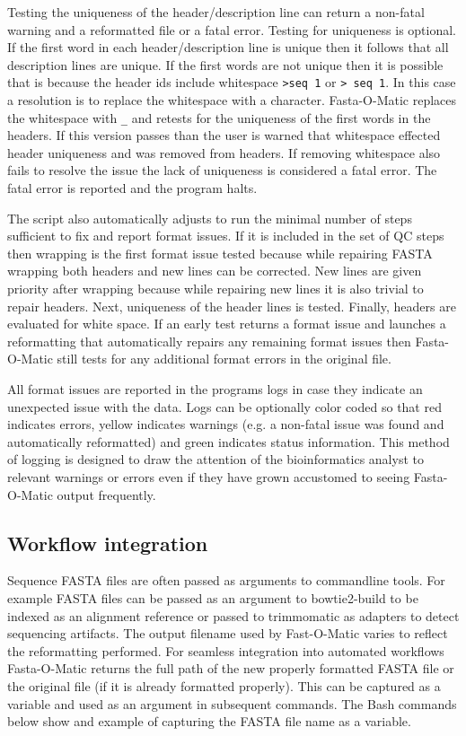 Testing the uniqueness of the header/description line can return a non-fatal warning and a reformatted file or a fatal error. Testing for uniqueness is optional. If the first word in each header/description line is unique then it follows that all description lines are unique. If the first words are not unique then it is possible that is because the header ids include whitespace \verb|>seq 1| or \verb|> seq 1|. In this case a resolution is to replace the whitespace with a character. Fasta-O-Matic replaces the whitespace with \verb|_| and retests for the uniqueness of the first words in the headers. If this version passes than the user is warned that whitespace effected header uniqueness and was removed from headers. If removing whitespace also fails to resolve the issue the lack of uniqueness is considered a fatal error. The fatal error is reported and the program halts.

The script also automatically adjusts to run the minimal number of steps sufficient to fix and report format issues. If it is included in the set of QC steps then wrapping is the first format issue tested because while repairing FASTA wrapping both headers and new lines can be corrected. New lines are given priority after wrapping because while repairing new lines it is also trivial to repair headers. Next, uniqueness of the header lines is tested. Finally, headers are evaluated for white space. If an early test returns a format issue and launches a reformatting that automatically repairs any remaining format issues then Fasta-O-Matic still tests for any additional format errors in the original file. 

All format issues are reported in the programs logs in case they indicate an unexpected issue with the data. Logs can be optionally color coded so that red indicates errors, yellow indicates warnings (e.g. a non-fatal issue was found and automatically reformatted) and green indicates status information. This method of logging is designed to draw the attention of the bioinformatics analyst to relevant warnings or errors even if they have grown accustomed to seeing Fasta-O-Matic output frequently.
  
\subsection{Workflow integration}
 
Sequence FASTA files are often passed as arguments to commandline tools. For example FASTA files can be passed as an argument to bowtie2-build to be indexed as an alignment reference \cite{langmead2012fast} or passed to trimmomatic as adapters to detect sequencing artifacts. The output filename used by Fast-O-Matic varies to reflect the reformatting performed. For seamless integration into automated workflows Fasta-O-Matic returns the full path of the new properly formatted FASTA file or the original file (if it is already formatted properly). This can be captured as a variable and used as an argument in subsequent commands. The Bash commands below show and example of capturing the FASTA file name as a variable.

